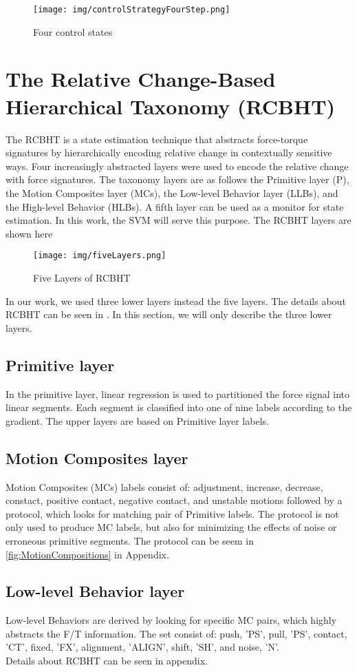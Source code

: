 \begin{figure}[h]
    \centering
    \texttt{[image: img/controlStrategyFourStep.png]}
    \caption{Four control states}
    \label{RCBHT}
\end{figure} 

\section{The Relative Change-Based Hierarchical Taxonomy (RCBHT)}
The RCBHT is a state estimation technique that abstracts force-torque signatures by hierarchically encoding relative change in contextually sensitive ways. Four increasingly abstracted layers were used to encode the relative change with force signatures. The taxonomy layers are as follows the Primitive layer (P), the Motion Composites layer (MCs), the Low-level Behavior layer (LLBs), and the High-level Behavior (HLBs). A fifth layer can be used as a monitor for state estimation. In this work, the SVM will serve this purpose. The RCBHT layers are shown here \\

\begin{figure}[h]
    \centering
    \texttt{[image: img/fiveLayers.png]}
    \caption{Five Layers of RCBHT}
    \label{RCBHT}
\end{figure} 

\indent In our work, we used three lower layers instead the five layers. The details about RCBHT can be seen in \cite{2012IROS-Rojas-RCBHT}. In this section, we will only describe the three lower layers.
\subsection{Primitive layer}
In the primitive layer, linear regression is used to partitioned the force signal into linear segments. Each segment is classified into one of nine labels according to the gradient. The upper layers are based on Primitive layer labels.
\subsection{Motion Composites layer}
Motion Composites (MCs) labels consist of: adjustment, increase, decrease, constact, positive contact, negative contact, and unstable motions followed by a protocol, which looks for matching pair of Primitive labels. The protocol is not only used to produce MC labels, but also for minimizing the effects of noise or erroneous primitive segments. The protocol can be seem in \ref{fig:MotionCompositions} in Appendix. 
\subsection{Low-level Behavior layer}
Low-level Behaviors are derived by looking for specific MC pairs, which highly abstracts the F/T information. The set consist of: {push, 'PS'}, {pull, 'PS'}, {contact, 'CT'}, {fixed, 'FX'}, {alignment, 'ALIGN'}, {shift, 'SH'}, and {noise, 'N'}. \\

\indent Details about RCBHT can be seen in appendix.


